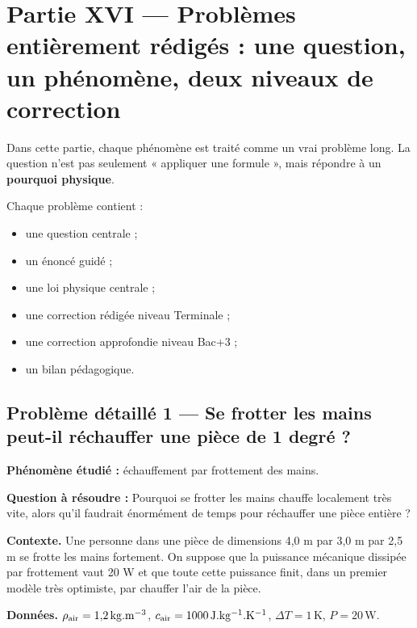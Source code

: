 \documentclass[11pt,a4paper]{article}
\begin{document}
\section{Partie XVI — Problèmes entièrement rédigés : une question, un phénomène, deux niveaux de correction}

\begin{attentionbox}
Dans cette partie, chaque phénomène est traité comme un vrai problème long. La question n'est pas seulement « appliquer une formule », mais répondre à un \textbf{pourquoi physique}. 

Chaque problème contient :
\begin{itemize}
  \item une question centrale ;
  \item un énoncé guidé ;
  \item une loi physique centrale ;
  \item une correction rédigée niveau Terminale ;
  \item une correction approfondie niveau Bac+3 ;
  \item un bilan pédagogique.
\end{itemize}
\end{attentionbox}

\subsection{Problème détaillé 1 — Se frotter les mains peut-il réchauffer une pièce de 1 degré ?}

\begin{exercicebox}
\textbf{Phénomène étudié :} échauffement par frottement des mains.

\medskip
\textbf{Question à résoudre :} Pourquoi se frotter les mains chauffe localement très vite, alors qu'il faudrait énormément de temps pour réchauffer une pièce entière ?

\medskip
\textbf{Contexte.} Une personne dans une pièce de dimensions 4,0 m par 3,0 m par 2,5 m se frotte les mains fortement. On suppose que la puissance mécanique dissipée par frottement vaut 20 W et que toute cette puissance finit, dans un premier modèle très optimiste, par chauffer l'air de la pièce.

\medskip
\textbf{Données.} $\rho_{\rm air}=1{,}2\,\mathrm{kg.m^{-3}}$, $c_{\rm air}=1000\,\mathrm{J.kg^{-1}.K^{-1}}$, $\Delta T=1\,\mathrm K$, $P=20\,\mathrm W$.
\end{exercicebox}
\end{document}
